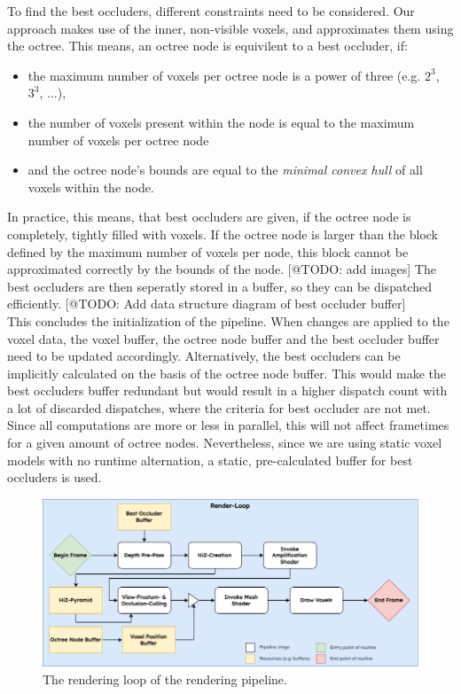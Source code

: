 \noindent
To find the best occluders, different constraints need to be considered. Our approach makes use of the inner, non-visible 
voxels, and approximates them using the octree. This means, an octree node is equivilent to a best occluder, if:

\begin{itemize}
    \item the maximum number of voxels per octree node is a power of three (e.g. $2^{3}$,  $3^{3}$, ...),
    \item the number of voxels present within the node is equal to the maximum number of voxels per octree node
    \item and the octree node's bounds are equal to the \emph{minimal convex hull} of all voxels within the node.
\end{itemize}

\noindent
In practice, this means, that best occluders are given, if the octree node is completely, tightly filled 
with voxels. If the octree node is larger than the block defined by the maximum number of voxels per node, 
this block cannot be approximated correctly by the bounds of the node. [@TODO: add images]
The best occluders are then seperatly stored in a buffer, so they can be dispatched efficiently.
[@TODO: Add data structure diagram of best occluder buffer]\\

\noindent
This concludes the initialization of the pipeline. When changes are applied to the voxel data, the voxel buffer,
the octree node buffer and the best occluder buffer need to be updated accordingly. Alternatively, the best 
occluders can be implicitly calculated on the basis of the octree node buffer. This would make the best 
occluders buffer redundant but would result in a higher dispatch count with a lot of discarded dispatches, 
where the criteria for best occluder are not met. Since all computations are more or less in parallel, this 
will not affect frametimes for a given amount of octree nodes. Nevertheless, since we are using static 
voxel models with no runtime alternation, a static, pre-calculated buffer for best occluders is used.
   

\begin{figure}[h]
    \centering
    \includegraphics[width=\linewidth]{images/graphics/render-loop.png}
    \caption{The rendering loop of the rendering pipeline.}
    \label{fig:pipeline-loop}
\end{figure}





